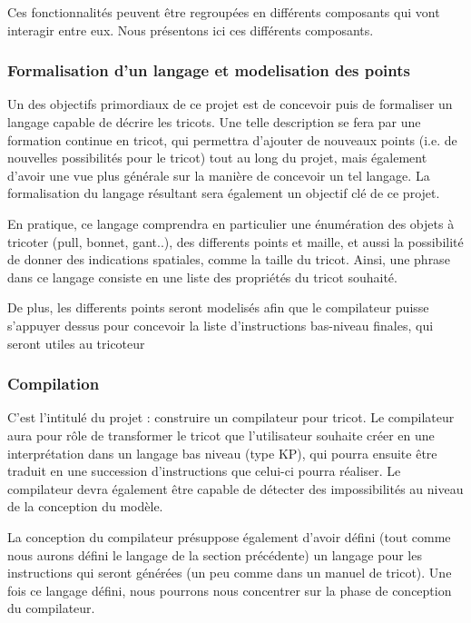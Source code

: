 \documentclass{article}
\begin{document}
Ces fonctionnalités peuvent être regroupées en différents composants qui vont interagir entre eux. Nous présentons ici ces différents 
composants.

\subsubsection{Formalisation d'un langage et modelisation des points}


Un des objectifs primordiaux de ce projet est de concevoir puis de formaliser un langage capable de décrire les tricots.
Une telle description se fera par une formation continue en tricot, qui permettra d'ajouter de nouveaux points (i.e. de nouvelles possibilités pour le tricot) tout au long du projet, mais également d'avoir une vue plus générale sur la manière de concevoir un tel
langage. La formalisation du langage résultant sera également un objectif clé de ce projet.

En pratique, ce langage comprendra en particulier une énumération des objets à tricoter (pull, bonnet, gant..), des differents points et maille, et aussi la possibilité de donner des indications spatiales, comme la taille du tricot. Ainsi, une phrase dans ce langage consiste en une liste des propriétés du tricot souhaité.

De plus, les differents points seront modelisés afin que le compilateur puisse s'appuyer dessus pour concevoir la liste d'instructions bas-niveau finales, qui seront utiles au tricoteur 

\subsubsection{Compilation}

C'est l'intitulé du projet : construire un compilateur pour tricot. Le compilateur aura pour rôle de transformer le tricot que
l'utilisateur souhaite créer en une interprétation dans un langage bas niveau (type KP), qui pourra ensuite être traduit en une succession
d'instructions que celui-ci pourra réaliser.
Le compilateur devra également être capable de détecter des impossibilités au niveau de la conception du modèle.

La conception du compilateur présuppose également d'avoir défini (tout comme nous aurons défini le langage de la section précédente) un
langage pour les instructions qui seront générées (un peu comme dans un manuel de tricot).
Une fois ce langage défini, nous pourrons nous concentrer sur la phase de conception du compilateur.
\end{document}
